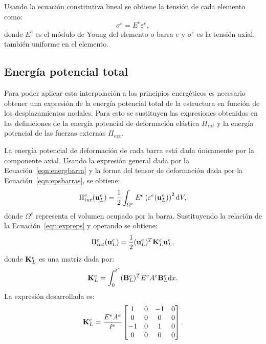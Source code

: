 Usando la ecuación constitutiva lineal se obtiene la tensión de cada elemento como:
%
\begin{equation}\label{eqn:barraeccons}
\sigma^e = E^e \varepsilon^e,
\end{equation}
donde $E^e$ es el módulo de Young del elemento o barra $e$ y $\sigma^e$ es la tensión axial, también uniforme en el elemento.


\subsection{Energía potencial total}

Para poder aplicar esta interpolación a los principios energéticos es necesario obtener una expresión de la energía potencial total de la estructura en función de los desplazamientos nodales. %
%
Para esto se sustituyen las expresiones obtenidas en las definiciones de la energía potencial de deformación elástica $\Pi_{int}$ y la energía potencial de las fuerzas externas $\Pi_{ext}$.

La energía potencial de deformación de cada barra está dada únicamente por la componente axial. Usando la expresión general dada por la Ecuación~\eqref{eqn:energbarra} y la forma del tensor de deformación dada por la Ecuación~\eqref{eqn:epsbarras}, se obtiene:
%
\begin{equation}
\Pi_{int}^e (\bfu_L^e) %
%
= \frac{1}{2} \int_{\Omega^e} E^e \left(\varepsilon^e (\bfu_L^e) \right)^2 \dif V ,
%
\end{equation}
%
donde $\Omega^e$ representa el volumen ocupado por la barra. %
%
Sustituyendo la relación de la Ecuación~\eqref{eqn:expreps} y operando se obtiene:
%
\begin{equation}
\Pi_{int}^e({\bf u}_L^e) = \frac{1}{2} ({\bf u}_L^e)^T {\bf K}_L^e {\bf u}_L^e ,
\end{equation}
%
donde ${\bf K}_L^e$ es una matriz dada por:
%
\begin{equation}\label{eqn:defK}
 {\bf K}_L^e = \int_{0}^{\ell^e} ({\bf B}_L^e)^T E^e A^e {\bf B}_L^e {\text{d}} x.
\end{equation}
%
La expresión desarrollada es:
%
\begin{equation}
{\bf K}_L^e = \frac{E^e A^e}{\ell^e} 
\left[
\begin{matrix}
1 & 0 & -1 & 0 \\
0 & 0 & 0 & 0\\
-1 & 0 &  1 & 0\\
0 & 0 & 0 & 0
\end{matrix}
\right].
\end{equation}
%

